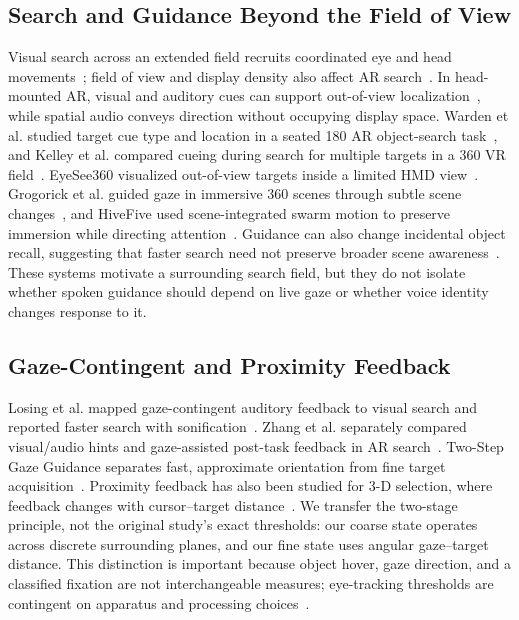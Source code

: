 \documentclass[10pt,journal,compsoc]{IEEEtran}
\begin{document}
\subsection{Search and Guidance Beyond the Field of View}
Visual search across an extended field recruits coordinated eye and head movements~\cite{stein2024eyehead}; field of view and display density also affect AR search~\cite{trepkowski2019fov}. In head-mounted AR, visual and auditory cues can support out-of-view localization~\cite{binetti2021outofview,marquardt2020guidance}, while spatial audio conveys direction without occupying display space. Warden et al. studied target cue type and location in a seated 180\textdegree{} AR object-search task~\cite{warden2022visual}, and Kelley et al. compared cueing during search for multiple targets in a 360\textdegree{} VR field~\cite{kelley2025cueing}. EyeSee360 visualized out-of-view targets inside a limited HMD view~\cite{gruenefeld2017eyesee360}. Grogorick et al. guided gaze in immersive 360\textdegree{} scenes through subtle scene changes~\cite{grogorick2017subtle}, and HiveFive used scene-integrated swarm motion to preserve immersion while directing attention~\cite{lange2020hivefive}. Guidance can also change incidental object recall, suggesting that faster search need not preserve broader scene awareness~\cite{kumaran2023navigation}. These systems motivate a surrounding search field, but they do not isolate whether spoken guidance should depend on live gaze or whether voice identity changes response to it.

\subsection{Gaze-Contingent and Proximity Feedback}
Losing et al. mapped gaze-contingent auditory feedback to visual search and reported faster search with sonification~\cite{losing2014guiding}. Zhang et al. separately compared visual/audio hints and gaze-assisted post-task feedback in AR search~\cite{zhang2023seehear}. Two-Step Gaze Guidance separates fast, approximate orientation from fine target acquisition~\cite{kwok2022twostep}. Proximity feedback has also been studied for 3-D selection, where feedback changes with cursor--target distance~\cite{ariza2018proximity}. We transfer the two-stage principle, not the original study's exact thresholds: our coarse state operates across discrete surrounding planes, and our fine state uses angular gaze--target distance. This distinction is important because object hover, gaze direction, and a classified fixation are not interchangeable measures; eye-tracking thresholds are contingent on apparatus and processing choices~\cite{chiossi2024searching}.
\end{document}
